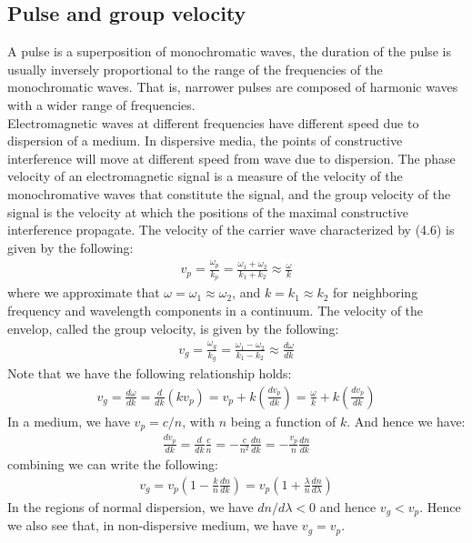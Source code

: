 \documentclass[11pt]{book}
\theoremstyle{break}
\theoremstyle{break}
\begin{document}
\subsection{Pulse and group velocity}
A pulse is a superposition of monochromatic waves, the duration of the pulse is usually inversely proportional to the range of the frequencies of the monochromatic waves. That is, narrower pulses are composed of harmonic waves with
a wider range of frequencies.\\

Electromagnetic waves at different frequencies have different speed due to dispersion of a medium. In dispersive media, the points of constructive interference will move at different speed from wave due to dispersion. The phase velocity of an electromagnetic signal is a measure of the velocity of the monochromative waves that constitute the signal, and the group velocity of the signal is the velocity at which the positions of the maximal constructive interference propagate. The velocity of the carrier wave characterized by (4.6) is given by the following:
\begin{align*}
v_p = \frac{\omega_p}{k_p} = \frac{\omega_1 + \omega_2}{k_1 + k_2} \approx \frac{\omega}{k}
\end{align*}
where we approximate that $\omega =\omega_1 \approx \omega_2$, and $k = k_1 \approx k_2$ for neighboring frequency and wavelength components in a continuum. The velocity of the envelop, called the group velocity, is given by the following:
\begin{align*}
v_g = \frac{\omega_g}{k_g} = \frac{\omega_1 - \omega_2}{k_1 - k_2} \approx \frac{d\omega}{dk}
\end{align*}
Note that we have the following relationship holds:
\begin{align*}
v_g = \frac{d\omega}{dk} = \frac{d}{dk}\left( k v_p\right) = v_p + k\left( \frac{dv_p}{dk}\right) = \frac{\omega}{k} + k\left( \frac{dv_p}{dk}\right)
\end{align*}
In a medium, we have $v_p = c/n$, with $n$ being a function of $k$. And hence we have:
\begin{align*}
\frac{dv_p}{dk} = \frac{d}{dk}\frac{c}{n} = -\frac{c}{n^2}\frac{dn}{dk} = -\frac{v_p}{n	} \frac{dn}{dk}
\end{align*}
combining we can write the following:
\begin{align*}
v_g = v_p \left( 1 - \frac{k}{n}\frac{dn}{dk}\right) = v_p \left( 1 + \frac{\lambda}{n}\frac{dn}{d\lambda}\right)
\end{align*}
In the regions of normal dispersion, we have $dn/d\lambda < 0$ and hence $v_g < v_p$. Hence we also see that, in non-dispersive medium, we have $v_g = v_p$. 
\end{document}
